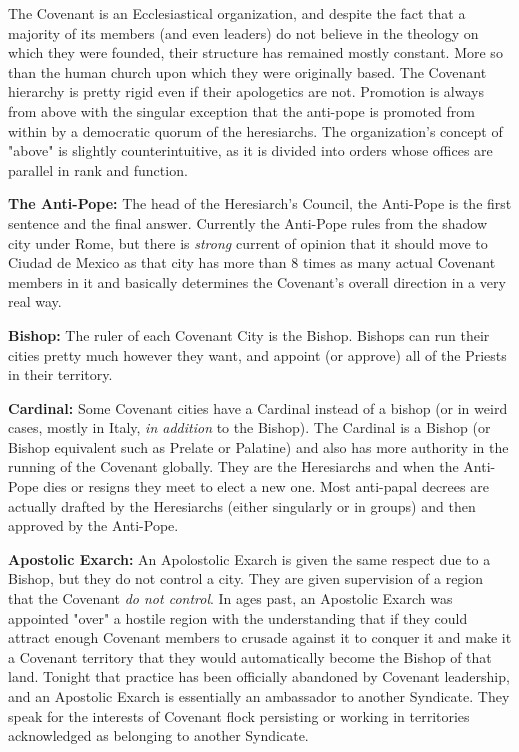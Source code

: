 The Covenant is an Ecclesiastical organization, and despite the fact that a majority of its members (and even leaders) do not believe in the theology on which they were founded, their structure has remained mostly constant. More so than the human church upon which they were originally based. The Covenant hierarchy is pretty rigid even if their apologetics are not. Promotion is always from above with the singular exception that the anti-pope is promoted from within by a democratic quorum of the heresiarchs. The organization's concept of "above" is slightly counterintuitive, as it is divided into orders whose offices are parallel in rank and function.

\textbf{The Anti-Pope:} The head of the Heresiarch's Council, the Anti-Pope is the first sentence and the final answer. Currently the Anti-Pope rules from the shadow city under Rome, but there is \textit{strong} current of opinion that it should move to Ciudad de Mexico as that city has more than 8 times as many actual Covenant members in it and basically determines the Covenant's overall direction in a very real way.

\textbf{Bishop:} The ruler of each Covenant City is the Bishop. Bishops can run their cities pretty much however they want, and appoint (or approve) all of the Priests in their territory.

\textbf{Cardinal:} Some Covenant cities have a Cardinal instead of a bishop (or in weird cases, mostly in Italy, \textit{in addition} to the Bishop). The Cardinal is a Bishop (or Bishop equivalent such as Prelate or Palatine) and also has more authority in the running of the Covenant globally. They are the Heresiarchs and when the Anti-Pope dies or resigns they meet to elect a new one. Most anti-papal decrees are actually drafted by the Heresiarchs (either singularly or in groups) and then approved by the Anti-Pope.

\textbf{Apostolic Exarch:} An Apolostolic Exarch is given the same respect due to a Bishop, but they do not control a city. They are given supervision of a region that the Covenant \textit{do not control}. In ages past, an Apostolic Exarch was appointed "over" a hostile region with the understanding that if they could attract enough Covenant members to crusade against it to conquer it and make it a Covenant territory that they would automatically become the Bishop of that land. Tonight that practice has been officially abandoned by Covenant leadership, and an Apostolic Exarch is essentially an ambassador to another Syndicate. They speak for the interests of Covenant flock persisting or working in territories acknowledged as belonging to another Syndicate.


